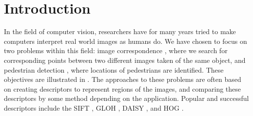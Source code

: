 \documentclass[thesis.tex]{subfiles}
\begin{document}
\section{Introduction}
\label{sec:introduction}

In the field of computer vision, researchers have for many years tried to make computers interpret real world images as humans do. We have chosen to focus on two problems within this field: image correspondence \cite{dahl2011finding}, where we search for corresponding points between two different images taken of the same object, and pedestrian detection \cite{felzenszwalb2008discriminatively}, where locations of pedestrians are identified. These objectives are illustrated in . The approaches to these problems are often based on creating descriptors to represent regions of the images, and comparing these descriptors by some method depending on the application. Popular and successful descriptors include the SIFT \cite{lowe2004distinctive}, GLOH \cite{mikolajczyk2005performance}, DAISY \cite{tola2008fast}, and HOG \cite{dalal2005histograms,felzenszwalb2009object}.
%
\end{document}
